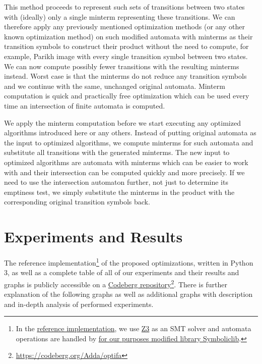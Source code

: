 This method proceeds to represent such sets of transitions between two states with (ideally) only a single minterm representing these transitions. We can therefore apply any previously mentioned optimization methods (or any other known optimization method) on such modified automata with minterms as their transition symbols to construct their product without the need to compute, for example, Parikh image with every single transition symbol between two states. We can now compute possibly fewer transitions with the resulting minterms instead. Worst case is that the minterms do not reduce any transition symbols and we continue with the same, unchanged original automata. Minterm computation is quick and practically free optimization which can be used every time an intersection of finite automata is computed.

We apply the minterm computation before we start executing any optimized algorithms introduced here or any others. Instead of putting original automata as the input to optimized algorithms, we compute minterms for such automata and substitute all transitions with the generated minterms. The new input to optimized algorithms are automata with minterms which can be easier to work with and their intersection can be computed quickly and more precisely. If we need to use the intersection automaton further, not just to determine its emptiness test, we simply substitute the minterms in the product with the corresponding original transition symbols back.

\chapter{Experiments and Results}\label{experimentsAndResultsChapter}

The reference implementation\footnote{In the \href{https://codeberg.org/Adda/optifa}{reference implementation}, we use \href{https://github.com/Z3Prover/z3}{Z3} as an SMT solver and automata operations are handled by \href{https://codeberg.org/Adda/symboliclib}{for our purposes modified library Symboliclib}.} of the proposed optimizations, written in Python 3, as well as a complete table of all of our experiments and their results and graphs is publicly accessible on a \href{https://codeberg.org/Adda/optifa}{Codeberg repository}\footnote{\url{https://codeberg.org/Adda/optifa}}. There is further explanation of the following graphs as well as additional graphs with description and in-depth analysis of performed experiments.


